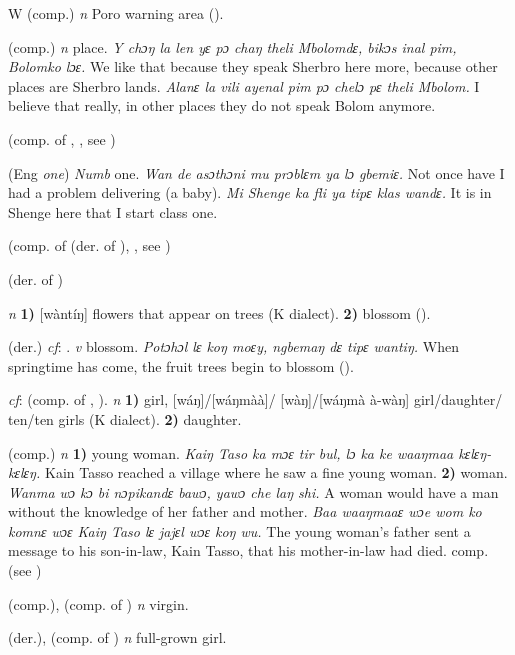 \begin{letter}{W}
 (comp.) \textit{n} Poro warning area (\citealt{Pichl1967}). 

 (comp.) \textit{n} place. \textit{Y chɔŋ la len yɛ pɔ chaŋ theli Mbolomdɛ, bikɔs inal pim, Bolomko lɔɛ.} We like that because they speak Sherbro here more, because other places are Sherbro lands. \textit{Alanɛ la vili ayenal pim pɔ chelɔ pɛ theli Mbolom.} I believe that really, in other places they do not speak Bolom anymore.

 (comp. of , , see ) 

 (Eng \textit{one}) \textit{Numb} one. \textit{Wan de asɔthɔni mu prɔblɛm ya lɔ gbemiɛ.} Not once have I had a problem delivering (a baby). \textit{Mi Shenge ka fli ya tipɛ klas wandɛ.} It is in Shenge here that I start class one.

 (comp. of  (der. of ), , see ) 

 (der. of ) 

 \textit{n} \textbf{1)} [wàntíŋ] flowers that appear on trees (K dialect). \textbf{2)} blossom (\citealt{Pichl1967}). 

 (der.) \textit{cf}: . \textit{v} blossom. \textit{Potɔhɔl lɛ koŋ moɛy, ngbemaŋ dɛ tipɛ wantiŋ.} When springtime has come, the fruit trees begin to blossom (\citealt{Pichl1967}). 

 \textit{cf}:  (comp. of , ). \textit{n} \textbf{1)} girl, [wáŋ]/[wáŋmàà]/ [wàŋ]/[wáŋmà à-wàŋ] girl/daughter/ ten/ten girls (K dialect). \textbf{2)} daughter.

 (comp.) \textit{n} \textbf{1)} young woman. \textit{Kaiŋ Taso ka mɔɛ tir bul, lɔ ka ke waaŋmaa kɛlɛŋ-kɛlɛŋ.} Kain Tasso reached a village where he saw a fine young woman. \textbf{2)} woman. \textit{Wanma wɔ kɔ bi nɔpikandɛ bawɔ, yawɔ che laŋ shi.} A woman would have a man without the knowledge of her father and mother. \textit{Baa waaŋmaaɛ wɔe wom ko komnɛ wɔɛ Kaiŋ Taso lɛ jajɛl wɔɛ koŋ wu.} The young woman's father sent a message to his son-in-law, Kain Tasso, that his mother-in-law had died. comp.  (see )

 (comp.), (comp. of ) \textit{n} virgin.

 (der.), (comp. of ) \textit{n} full-grown girl.


\end{letter}
